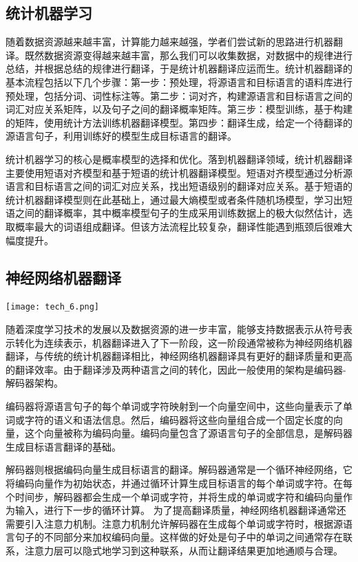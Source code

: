 \subsection{统计机器学习}

随着数据资源越来越丰富，计算能力越来越强，学者们尝试新的思路进行机器翻译。既然数据资源变得越来越丰富，那么我们可以收集数据，对数据中的规律进行总结，并根据总结的规律进行翻译，于是统计机器翻译应运而生。统计机器翻译的基本流程包括以下几个步骤：第一步：预处理，将源语言和目标语言的语料库进行预处理，包括分词、词性标注等。第二步：词对齐，构建源语言和目标语言之间的词汇对应关系矩阵，以及句子之间的翻译概率矩阵。第三步：模型训练，基于构建的矩阵，使用统计方法训练机器翻译模型。第四步：翻译生成，给定一个待翻译的源语言句子，利用训练好的模型生成目标语言的翻译。

统计机器学习的核心是概率模型的选择和优化。落到机器翻译领域，统计机器翻译主要使用短语对齐模型和基于短语的统计机器翻译模型。短语对齐模型通过分析源语言和目标语言之间的词汇对应关系，找出短语级别的翻译对应关系。基于短语的统计机器翻译模型则在此基础上，通过最大熵模型或者条件随机场模型，学习出短语之间的翻译概率，其中概率模型句子的生成采用训练数据上的极大似然估计，选取概率最大的词语组成翻译。但该方法流程比较复杂，翻译性能遇到瓶颈后很难大幅度提升。


\subsection{神经网络机器翻译}
\begin{marginfigure}
    \texttt{[image: tech\_6.png]}
\end{marginfigure}
随着深度学习技术的发展以及数据资源的进一步丰富，能够支持数据表示从符号表示转化为连续表示，机器翻译进入了下一阶段，这一阶段通常被称为神经网络机器翻译，与传统的统计机器翻译相比，神经网络机器翻译具有更好的翻译质量和更高的翻译效率。由于翻译涉及两种语言之间的转化，因此一般使用的架构是编码器-解码器架构。

编码器将源语言句子的每个单词或字符映射到一个向量空间中，这些向量表示了单词或字符的语义和语法信息。然后，编码器将这些向量组合成一个固定长度的向量，这个向量被称为编码向量。编码向量包含了源语言句子的全部信息，是解码器生成目标语言翻译的基础。

解码器则根据编码向量生成目标语言的翻译。解码器通常是一个循环神经网络，它将编码向量作为初始状态，并通过循环计算生成目标语言的每个单词或字符。在每个时间步，解码器都会生成一个单词或字符，并将生成的单词或字符和编码向量作为输入，进行下一步的循环计算。
为了提高翻译质量，神经网络机器翻译通常还需要引入注意力机制。注意力机制允许解码器在生成每个单词或字符时，根据源语言句子的不同部分来加权编码向量。这样做的好处是句子中的单词之间通常存在联系，注意力层可以隐式地学习到这种联系，从而让翻译结果更加地通顺与合理。


